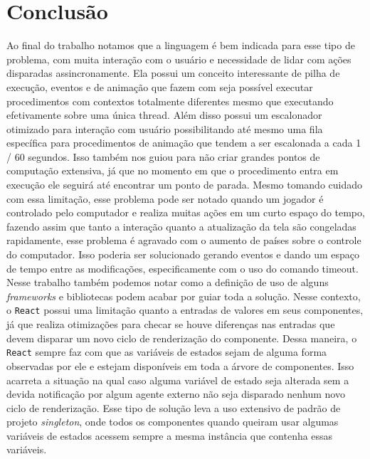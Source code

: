 \documentclass[rel_mlp]{iiufrgs}
\begin{document}
\chapter{Conclusão}
Ao final do trabalho notamos que a linguagem é bem indicada para esse tipo de problema, com muita interação com o usuário e necessidade de lidar com ações disparadas assincronamente.
Ela possui um conceito interessante de pilha de execução, eventos e de animação que fazem com seja possível executar procedimentos com contextos totalmente diferentes mesmo que executando efetivamente sobre uma única thread.
Além disso possui um escalonador otimizado para interação com usuário possibilitando até mesmo uma fila específica para procedimentos de animação que tendem a ser escalonada a cada 1 / 60 segundos.
Isso também nos guiou para não criar grandes pontos de computação extensiva, já que no momento em que o procedimento entra em execução ele seguirá até encontrar um ponto de parada.
Mesmo tomando cuidado com essa limitação, esse problema pode ser notado quando um jogador é controlado pelo computador e realiza muitas ações em um curto espaço do tempo, fazendo assim que tanto a interação quanto a atualização da tela são congeladas rapidamente, esse problema é agravado com o aumento de países sobre o controle do computador. Isso poderia ser solucionado gerando eventos e dando um espaço de tempo entre as modificações, especificamente com o uso do comando timeout.
Nesse trabalho também podemos notar como a definição de uso de alguns \textit{frameworks} e bibliotecas podem acabar por guiar toda a solução.
Nesse contexto, o \verb|React| possui uma limitação quanto a entradas de valores em seus componentes, já que realiza otimizações para checar se houve diferenças nas entradas que devem disparar um novo ciclo de renderização do componente.
Dessa maneira, o \verb|React| sempre faz com que as variáveis de estados sejam de alguma forma observadas por ele e estejam disponíveis em toda a árvore de componentes. Isso acarreta a situação na qual caso alguma variável de estado seja alterada sem a devida notificação por algum agente externo não seja disparado nenhum novo ciclo de renderização.
Esse tipo de solução leva a uso extensivo de padrão de projeto \textit{singleton}, onde todos os componentes quando queiram usar algumas variáveis de estados acessem sempre a mesma instância que contenha essas variáveis.
\end{document}
